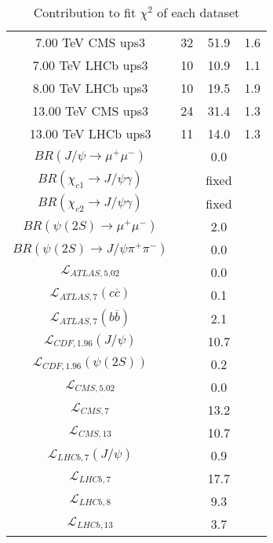 \begin{table}[h!]
\begin{tabular}{c|c|c|c}
7.00 TeV CMS ups3 & 32 & 51.9 & 1.6 \\
7.00 TeV LHCb ups3 & 10 & 10.9 & 1.1 \\
8.00 TeV LHCb ups3 & 10 & 19.5 & 1.9 \\
13.00 TeV CMS ups3 & 24 & 31.4 & 1.3 \\
13.00 TeV LHCb ups3 & 11 & 14.0 & 1.3 \\
\hline
$BR(J/\psi\rightarrow\mu^+\mu^-)$ &  & 0.0 &  \\
$BR(\chi_{c1}\rightarrow J/\psi\gamma)$ &  & fixed & \\
$BR(\chi_{c2}\rightarrow J/\psi\gamma)$ &  & fixed & \\
$BR(\psi(2S)\rightarrow\mu^+\mu^-)$ &  & 2.0 &  \\
$BR(\psi(2S)\rightarrow J/\psi\pi^+\pi^-)$ &  & 0.0 &  \\
$\mathcal L_{ATLAS,5.02}$ &  & 0.0 &  \\
$\mathcal L_{ATLAS,7}(c\overline c)$ &  & 0.1 &  \\
$\mathcal L_{ATLAS,7}(b\overline b)$ &  & 2.1 &  \\
$\mathcal L_{CDF,1.96}(J/\psi)$ &  & 10.7 &  \\
$\mathcal L_{CDF,1.96}(\psi(2S))$ &  & 0.2 &  \\
$\mathcal L_{CMS,5.02}$ &  & 0.0 &  \\
$\mathcal L_{CMS,7}$ &  & 13.2 &  \\
$\mathcal L_{CMS,13}$ &  & 10.7 &  \\
$\mathcal L_{LHCb,7}(J/\psi)$ &  & 0.9 &  \\
$\mathcal L_{LHCb,7}$ &  & 17.7 &  \\
$\mathcal L_{LHCb,8}$ &  & 9.3 &  \\
$\mathcal L_{LHCb,13}$ &  & 3.7 &  \\
\end{tabular}
\caption{Contribution to fit $\chi^2$ of each dataset}
\end{table}
